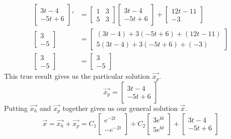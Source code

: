 \begin{align*}
	\begin{bmatrix}
		3t-4 \\
		-5t+6
	\end{bmatrix}' &= \begin{bmatrix}
		1 & 3 \\
		5 & 3
	\end{bmatrix} \begin{bmatrix}
		3t - 4 \\
		-5t + 6
	\end{bmatrix} + \begin{bmatrix}
		12t - 11 \\
		-3
	\end{bmatrix} \\
	\begin{bmatrix}
		3 \\
		-5
	\end{bmatrix} &= \begin{bmatrix}
		(3t-4) + 3(-5t+6) + (12t-11) \\
		5(3t-4) + 3(-5t+6) + (-3)
	\end{bmatrix} \\
	\begin{bmatrix}
		3 \\
		-5
	\end{bmatrix} &= \begin{bmatrix}
		3 \\
		-5
	\end{bmatrix}
\end{align*}
This true result gives us the particular solution $\vec{x_p}$.
\begin{equation*}
	\vec{x_p} = \begin{bmatrix}
		3t - 4 \\
		-5t + 6
	\end{bmatrix}
\end{equation*}
Putting $\vec{x_h}$ and $\vec{x_p}$ together gives us our general solution $\vec{x}$.
\begin{equation*}
	\vec{x} = \vec{x_h} + \vec{x_p} = C_1\begin{bmatrix}
		e^{-2t} \\
		-e^{-2t}
	\end{bmatrix} + C_2\begin{bmatrix}
		3e^{6t} \\
		5e^{6t}
	\end{bmatrix} + \begin{bmatrix}
		3t - 4 \\
		-5t + 6
	\end{bmatrix}
\end{equation*}